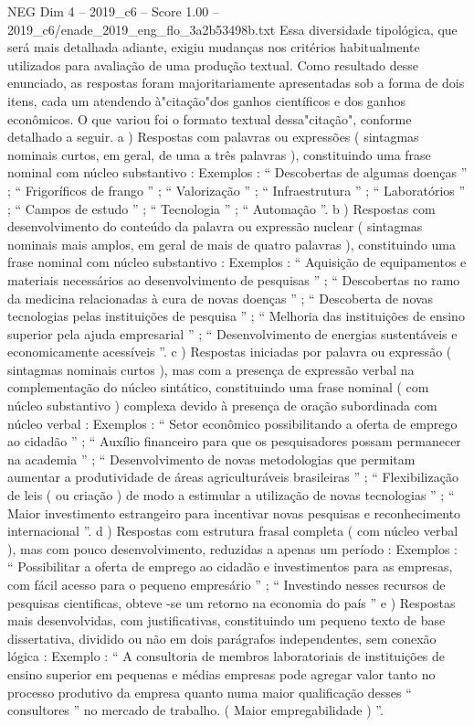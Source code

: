 \begin{textsample}{NEG Dim 4 – 2019\_c6 – Score 1.00 – 2019\_c6/enade\_2019\_eng\_flo\_3a2b53498b.txt}
Essa diversidade tipológica, que será mais detalhada adiante, exigiu mudanças nos critérios habitualmente utilizados para avaliação de uma produção textual.
Como resultado desse enunciado, as respostas foram majoritariamente apresentadas sob a forma de dois itens, cada um atendendo à"citação"dos ganhos científicos e dos ganhos econômicos.
O que variou foi o formato textual dessa"citação", conforme detalhado a seguir. a ) Respostas com palavras ou expressões ( sintagmas nominais curtos, em geral, de uma a três palavras ), constituindo uma frase nominal com núcleo substantivo : Exemplos : “ Descobertas de algumas doenças ” ; “ Frigoríficos de frango ” ; “ Valorização ” ; “ Infraestrutura ” ; “ Laboratórios ” ; “ Campos de estudo ” ; “ Tecnologia ” ; “ Automação ”. b ) Respostas com desenvolvimento do conteúdo da palavra ou expressão nuclear ( sintagmas nominais mais amplos, em geral de mais de quatro palavras ), constituindo uma frase nominal com núcleo substantivo : Exemplos : “ Aquisição de equipamentos e materiais necessários ao desenvolvimento de pesquisas ” ; “ Descobertas no ramo da medicina relacionadas à cura de novas doenças ” ; “ Descoberta de novas tecnologias pelas instituições de pesquisa ” ; “ Melhoria das instituições de ensino superior pela ajuda empresarial ” ; “ Desenvolvimento de energias sustentáveis e economicamente acessíveis ”. c ) Respostas iniciadas por palavra ou expressão ( sintagmas nominais curtos ), mas com a presença de expressão verbal na complementação do núcleo sintático, constituindo uma frase nominal ( com núcleo substantivo ) complexa devido à presença de oração subordinada com núcleo verbal : Exemplos : “ Setor econômico possibilitando a oferta de emprego ao cidadão ” ; “ Auxílio financeiro para que os pesquisadores possam permanecer na academia ” ; “ Desenvolvimento de novas metodologias que permitam aumentar a produtividade de áreas agriculturáveis brasileiras ” ; “ Flexibilização de leis ( ou criação ) de modo a estimular a utilização de novas tecnologias ” ; “ Maior investimento estrangeiro para incentivar novas pesquisas e reconhecimento internacional ”. d ) Respostas com estrutura frasal completa ( com núcleo verbal ), mas com pouco desenvolvimento, reduzidas a apenas um período : Exemplos : “ Possibilitar a oferta de emprego ao cidadão e investimentos para as empresas, com fácil acesso para o pequeno empresário ” ; “ Investindo nesses recursos de pesquisas cientificas, obteve -se um retorno na economia do país ” e ) Respostas mais desenvolvidas, com justificativas, constituindo um pequeno texto de base dissertativa, dividido ou não em dois parágrafos independentes, sem conexão lógica : Exemplo : “ A consultoria de membros laboratoriais de instituições de ensino superior em pequenas e médias empresas pode agregar valor tanto no processo produtivo da empresa quanto numa maior qualificação desses “ consultores ” no mercado de trabalho. ( Maior empregabilidade ) ”.

\end{textsample}
